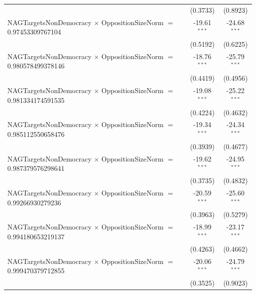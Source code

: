\begin{tabular}{lcc}
                                                                                & (0.3733)             & (0.8923)\\   
   NAGTargetsNonDemocracy $\times$ OppositionSizeNorm $=$ 0.97453309767104      & -19.61$^{***}$       & -24.68$^{***}$\\   
                                                                                & (0.5192)             & (0.6225)\\   
   NAGTargetsNonDemocracy $\times$ OppositionSizeNorm $=$ 0.980578499378146     & -18.76$^{***}$       & -25.79$^{***}$\\   
                                                                                & (0.4419)             & (0.4956)\\   
   NAGTargetsNonDemocracy $\times$ OppositionSizeNorm $=$ 0.981334174591535     & -19.08$^{***}$       & -25.22$^{***}$\\   
                                                                                & (0.4224)             & (0.4632)\\   
   NAGTargetsNonDemocracy $\times$ OppositionSizeNorm $=$ 0.985112550658476     & -19.34$^{***}$       & -24.34$^{***}$\\   
                                                                                & (0.3939)             & (0.4677)\\   
   NAGTargetsNonDemocracy $\times$ OppositionSizeNorm $=$ 0.987379576298641     & -19.62$^{***}$       & -24.95$^{***}$\\   
                                                                                & (0.3735)             & (0.4832)\\   
   NAGTargetsNonDemocracy $\times$ OppositionSizeNorm $=$ 0.99266930279236      & -20.59$^{***}$       & -25.60$^{***}$\\   
                                                                                & (0.3963)             & (0.5279)\\   
   NAGTargetsNonDemocracy $\times$ OppositionSizeNorm $=$ 0.994180653219137     & -18.99$^{***}$       & -23.17$^{***}$\\   
                                                                                & (0.4263)             & (0.4662)\\   
   NAGTargetsNonDemocracy $\times$ OppositionSizeNorm $=$ 0.999470379712855     & -20.06$^{***}$       & -24.79$^{***}$\\   
                                                                                & (0.3525)             & (0.9023)\\   

\end{tabular}
